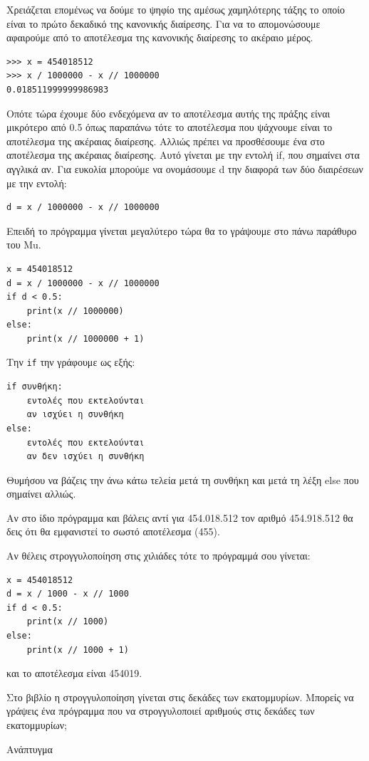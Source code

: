 Χρειάζεται επομένως να δούμε το ψηφίο της αμέσως χαμηλότερης τάξης το οποίο είναι το πρώτο δεκαδικό της κανονικής διαίρεσης. Για να το απομονώσουμε αφαιρούμε από το αποτέλεσμα της κανονικής διαίρεσης το ακέραιο μέρος.
\begin{lstlisting}
>>> x = 454018512
>>> x / 1000000 - x // 1000000
0.018511999999986983
\end{lstlisting}
Οπότε τώρα έχουμε δύο ενδεχόμενα αν το αποτέλεσμα αυτής της πράξης είναι μικρότερο από 0.5 όπως παραπάνω τότε το αποτέλεσμα που ψάχνουμε είναι το αποτέλεσμα της ακέραιας διαίρεσης. Αλλιώς πρέπει να προσθέσουμε ένα στο αποτέλεσμα της ακέραιας διαίρεσης.
Αυτό γίνεται με την εντολή if, που σημαίνει στα αγγλικά αν. Για ευκολία μπορούμε να ονομάσουμε d την διαφορά των δύο διαιρέσεων με την εντολή:
\begin{lstlisting}
d = x / 1000000 - x // 1000000
\end{lstlisting}
Επειδή το πρόγραμμα γίνεται μεγαλύτερο τώρα θα το γράψουμε στο πάνω παράθυρο του Mu.
\begin{lstlisting}
x = 454018512
d = x / 1000000 - x // 1000000
if d < 0.5:
    print(x // 1000000)
else:
    print(x // 1000000 + 1)
\end{lstlisting}
Την \lstinline{if} την γράφουμε ως εξής:
\begin{lstlisting}
if συνθήκη:
    εντολές που εκτελούνται
    αν ισχύει η συνθήκη
else:
    εντολές που εκτελούνται
    αν δεν ισχύει η συνθήκη
\end{lstlisting}
Θυμήσου να βάζεις την άνω κάτω τελεία μετά τη συνθήκη και μετά τη λέξη else που σημαίνει αλλιώς.

Αν στο ίδιο πρόγραμμα και βάλεις αντί για 454.018.512 τον αριθμό 454.918.512 θα δεις ότι θα εμφανιστεί το σωστό αποτέλεσμα (455).

Αν θέλεις στρογγυλοποίηση στις χιλιάδες τότε το πρόγραμμά σου γίνεται:
\begin{lstlisting}
x = 454018512
d = x / 1000 - x // 1000
if d < 0.5:
    print(x // 1000)
else:
    print(x // 1000 + 1)
\end{lstlisting}
και το αποτέλεσμα είναι 454019.

\begin{exercise}
Στο βιβλίο  η στρογγυλοποίηση γίνεται στις δεκάδες των εκατομμυρίων. Μπορείς να γράψεις ένα πρόγραμμα που να στρογγυλοποιεί αριθμούς στις δεκάδες των εκατομμυρίων;
\end{exercise}



Ανάπτυγμα